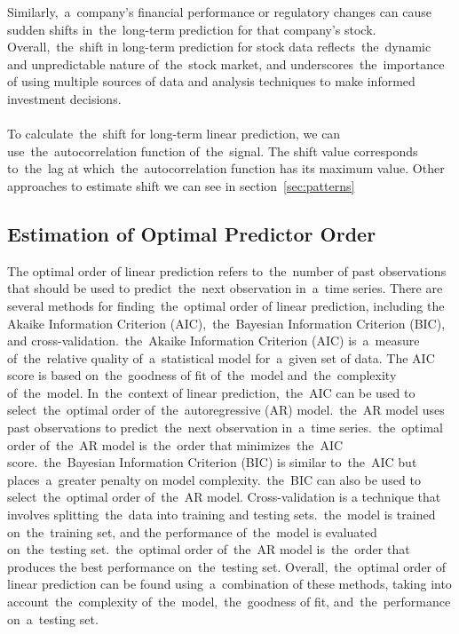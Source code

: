 Similarly,~a~company's financial performance or regulatory changes can cause sudden shifts in~the~long-term prediction
for that company's stock. Overall,~the~shift in long-term prediction for stock data reflects~the~dynamic and
unpredictable nature of~the~stock market, and underscores~the~importance of using multiple sources of data and analysis
techniques to make informed investment decisions.\\
\\
To calculate~the~shift for long-term linear prediction, we can use~the~autocorrelation function of~the~signal.
The shift value corresponds to~the~lag at which~the~autocorrelation function has its maximum value. Other approaches to estimate shift we can see in section~\ref{sec:patterns}


\subsection{Estimation of Optimal Predictor Order} \label{subsec:orderlp}
The optimal order of linear prediction refers to~the~number of past observations that should be used to predict~the~next
observation in~a~time series. There are several methods for finding~the~optimal order of linear prediction, including
the Akaike Information Criterion (AIC),~the~Bayesian Information Criterion (BIC), and cross-validation.~the~Akaike
Information Criterion (AIC) is~a~measure of~the~relative quality of~a~statistical model for~a~given set of data.
The AIC score is based on~the~goodness of fit of~the~model and~the~complexity of~the~model. In~the~context of linear
prediction,~the~AIC can be used to select~the~optimal order of~the~autoregressive (AR) model.~the~AR model uses past
observations to predict~the~next observation in~a~time series.~the~optimal order of~the~AR model is~the~order that
minimizes~the~AIC score.~the~Bayesian Information Criterion (BIC) is similar to~the~AIC but places~a~greater penalty
on model complexity.~the~BIC can also be used to select~the~optimal order of~the~AR model. Cross-validation is a
technique that involves splitting~the~data into training and testing sets.~the~model is trained on~the~training set, and
the performance of~the~model is evaluated on~the~testing set.~the~optimal order of~the~AR model is~the~order that produces
the best performance on~the~testing set. Overall,~the~optimal order of linear prediction can be found using~a~combination
of these methods, taking into account~the~complexity of~the~model,~the~goodness of fit, and~the~performance on~a~testing set.\\
